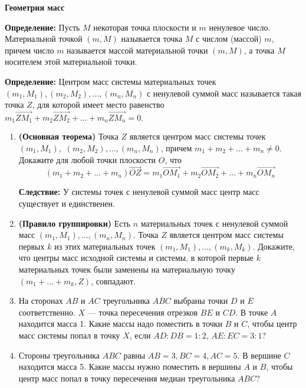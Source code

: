 \documentclass{article}
\begin{document}
\large

\begin{center}
\textbf{Геометрия масс}
\end{center}


\textbf{Определение:} Пусть $M$ некоторая точка плоскости и $m$ ненулевое число. Материальной точкой $(m,M)$ называется точка $M$ с числом (массой) $m$, причем число $m$ называется массой материальной точки $(m, M)$, а точка $M$ носителем этой материальной точки.

\textbf{Определение:} Центром масс системы материальных точек $(m_1, M_1), (m_2, M_2), \dotsc, (m_n,M_n)$ с ненулевой суммой масс называется такая точка $Z$, для которой имеет место
равенство $m_1\overrightarrow{ZM_1}+m_2\overrightarrow{ZM_2}+ \dotsc + m_n\overrightarrow{ZM_n} = 0.$

\begin{enumerate}[label*=\protect\fbox{\arabic{enumi}}]


\item \textbf{(Основная теорема)} Точка $Z$ является центром масс системы точек $(m_1,M_1),$ $(m_2,M_2), \dotsc, (m_n,M_n)$, причем $m_1 + m_2 + \dotsc + m_n \neq 0$. Докажите для любой точки плоскости $O$, что
$$(m_1 +m_2 +...+m_n)\overrightarrow{OZ} =m_1\overrightarrow{OM_1} +m_2\overrightarrow{OM_2} +\dotsc +m_n\overrightarrow{OM_n}$$

\textbf{Следствие:} У системы точек с ненулевой суммой масс центр масс существует и единственен.
\item \textbf{(Правило группировки)} Есть $n$ материальных точек с ненулевой суммой масс $(m_1, M_1), \dotsc , (m_n, M_n)$. Точка $Z$ является центром масс системы первых $k$ из этих материальных точек $(m_1, M_1), \dotsc , (m_k, M_k)$. Докажите, что центры масс исходной системы и системы, в которой первые $k$ материальных точек были заменены на материальную точку $(m_1 + \dotsc + m_k, Z)$, совпадают.

\item На сторонах $AB$ и $AC$ треугольника $ABC$ выбраны точки $D$ и $E$ соответственно. $X$ — точка пересечения отрезков $BE$ и $CD$.
В точке $A$ находится масса 1.
Какие массы надо поместить в точки $B$ и $C$, чтобы центр масс системы попал в точку $X$, если $AD:DB=1:2$, $AE:EC=3:1$?

\item Стороны треугольника $ABC$ равны $AB=3, BC = 4, AC = 5$. В вершине $C$ находится масса 5. Какие массы нужно поместить в вершины $A$ и $B$, чтобы центр масс попал в точку пересечения медиан треугольника $ABC$?


\end{enumerate}
\end{document}

